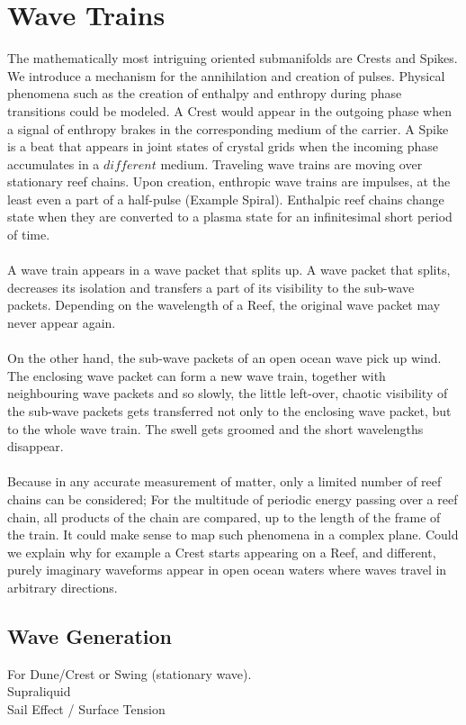 \documentclass{report}
\begin{document}
\section{Wave Trains}
The mathematically most intriguing oriented submanifolds are Crests and Spikes. We introduce a mechanism for the annihilation and creation of pulses. Physical phenomena such as the creation of enthalpy and enthropy during phase transitions could be modeled. A Crest would appear in the outgoing phase when a signal of enthropy brakes in the corresponding medium of the carrier. A Spike is a beat that appears in joint states of crystal grids when the incoming phase accumulates in a $different$ medium.
Traveling wave trains are moving over stationary reef chains. Upon creation, enthropic wave trains are impulses, at the least even a part of a half-pulse (Example Spiral). Enthalpic reef chains change state when they are converted to a plasma state for an infinitesimal short period of time.\\\\
A wave train appears in a wave packet that splits up. A wave packet that splits, decreases its isolation and transfers a part of its visibility to the sub-wave packets. Depending on the wavelength of a Reef, the original wave packet may never appear again.\\\\
On the other hand, the sub-wave packets of an open ocean wave pick up wind. The enclosing wave packet can form a new wave train, together with neighbouring wave packets and so slowly, the little left-over, chaotic visibility of the sub-wave packets gets transferred not only to the enclosing wave packet, but to the whole wave train. The swell gets groomed and the short wavelengths disappear.\\\\
Because in any accurate measurement of matter, only a limited number of reef chains can be considered; For the multitude of periodic energy passing over a reef chain, all products of the chain are compared, up to the length of the frame of the train.
It could make sense to map such phenomena in a complex plane. Could we explain why for example a Crest starts appearing on a Reef, and different, purely imaginary waveforms appear in open ocean waters where waves travel in arbitrary directions.

\subsection{Wave Generation}
For Dune/Crest or Swing (stationary wave).\\
Supraliquid\\
Sail Effect / Surface Tension
\end{document}
